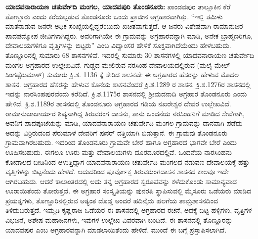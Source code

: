 \textbf{ಯಾದವನಾರಾಯಣ ಚತುರ್ವೇದಿ ಮಂಗಲ, ಯಾದವಪುರಿ \general{\enginline{-}} ತೊಂಡನೂರು:} ಪಾಂಡವಪುರ ತಾಲ್ಲೂಕಿನ ಕೆರೆ ತೊಣ್ಣೂರು ಎಂದು ಕರೆಯಲ್ಪಡುವ ತೊಂಡನೂರು ಒಂದು ಪ್ರಾಚೀನ ಅಗ್ರಹಾರವಾಗಿತ್ತು. “ಇಲ್ಲಿ ತಮಿಳು ಮಾತನಾಡುವ ಜನರೇ ಅಧಿಕ ಸಂಖ್ಯೆಯಲ್ಲಿದ್ದರೆಂಬುದು ಖಚಿತವಾಗುತ್ತದೆ. ಆ ಜನರು ವಿಶೇಷವಾಗಿ ರಾಮಾನುಜರ ಪಾದಪದ್ಮೋಪ ಜೀವಿಗಳಾಗಿದ್ದರು. ಅವರಿಗಾಗಿಯೇ ಈ ಗ್ರಾಮವನ್ನು ಅಗ್ರಹಾರವನ್ನಾಗಿ ಮಾಡಿ, ಅನೇಕ ಬ್ರಾಹ್ಮಣರಿಗೂ, ದೇವಾಲಯಗಳಿಗೂ ವೃತ್ತಿಗಳನ್ನು ಬಿಟ್ಟರು” ಎಂಬ ವಿದ್ವಾಂಸರ ಹೇಳಿಕೆ ಸೂಕ್ತವಾಗಿದೆಯೆಂದು ಹೇಳಬಹುದು. ತೊಣ್ಣೂರಿನಲ್ಲಿ ಸುಮಾರು 68 ಶಾಸನಗಳಿವೆ. ಇದರಲ್ಲಿ ಸುಮಾರು 30 ಶಾಸನಗಳಲ್ಲಿ ಯಾದವನಾರಾಯಣ ಚತುರ್ವೇದಿ ಮಂಗಲ ಅಗ್ರಹಾರದ ಉಲ್ಲೇಖವಿದೆ. ಗುಡ್ಡದ ಮೇಲಿರುವ ನರಸಿಂಹ ದೇವಾಲಯದಲ್ಲಿರುವ (ಮಲೈ ಮೇಲ್​ ಸಿಂಗಪ್ಪೆರುಮಾಳ್​) ಸುಮಾರು ಕ್ರಿ.ಶ. 1136 ಕ್ಕೆ ಸೇರಿದ ಶಾಸನವೇ ಈ ಅಗ್ರಹಾರದ ಹೆಸರನ್ನು ಹೇಳುವ ಮೊದಲ ಶಾಸನ. ಅಗ್ರಹಾರದ ಹೆಸರನ್ನು ಹೇಳುವ ಕೊನೆಯ ಶಾಸನವೆಂದರೆ ಕ್ರಿ.ಶ.1289 ರ ಶಾಸನ. ಕ್ರಿ.ಶ.1276ರ ಶಾಸನದಲ್ಲಿ ಇದನ್ನು ನಾರಸಿಂಹಪುರವೆಂದು ಕರೆದಿದೆ. ಕ್ರಿ.ಶ.1175ರ ಶಾಸನದಲ್ಲಿ ಶ‍್ರೀಮದನಾದಿ ಅಗ್ರಹಾರ ತೊಂಡನೂರು ಎಂದು ಹೇಳಿದೆ. ಕ್ರಿ.ಶ.1189ರ ಶಾಸನದಲ್ಲಿ ತೊಂಡನೂರು ಅಗ್ರಹಾರದ ಗಡಿಯ ನಖರೇಶ್ವರ ದೇವರ ಉಲ್ಲೇಖವಿದೆ. ರಾಮಾನುಜಾಚಾರ್ಯರ ಶಿಷ್ಯನಾಗಿದ್ದ ತಿರುವರಂಗ ದಾಸನು, ತಾನು ಒಂದನೆಯ ನರಸಿಂಹನಿಗೆ ಮಾಡಿದ ಸೇವೆಗಾಗಿ, ಅವನಿಗೆ ಪಾದಪೂಜೆಯನ್ನು ಮಾಡಿ, ಯಾದವನಾರಾಯಣ ಚತುರ್ವೇದಿ ಮಂಗಲ ಗ್ರಾಮವನ್ನು ದಾನವಾಗಿ ಪಡೆದು ಅದನ್ನು ವಿರ್ರಿರುದಂದ ಪೆರುಮಾಳೆ ದೇವರಿಗೆ ಪುನರ್​ ದತ್ತಿಯಾಗಿ ಬಿಡುತ್ತಾನೆ. ಈ ಗ್ರಾಮವು ತೊಂಡನೂರು ಗ್ರಾಮವಾಗಿರಬಹುದು. ಇದರಿಂದ ತೊಂಡನೂರು ಗ್ರಾಮವೇ ಬೇರೆ ಹಾಗೂ ಅಗ್ರಹಾರದ ಭಾಗವೇ ಬೇರೆ ಎಂದು ಊಹಿಸಬಹುದು. ಈಗಲೂ ಊರು ಮತ್ತು ದೇವಾಲಯಗಳು ದೂರದೂರದಲ್ಲಿವೆ. ಒಂದನೆಯ ನಾರಸಿಂಹನು ಕೋಡಾಲದ ಬೀಡಿನಿಂದ ಆಳುತ್ತಿದ್ದಾಗ ಯಾದವನಾರಾಯಣ ಚತುರ್ವೇದಿ ಮಂಗಲದ ನಡುವಣ ದೇವಾಲಯಕ್ಕೆ ಹತ್ತು ವೃತ್ತಿಗಳನ್ನು ಬಿಟ್ಟನೆಂದು ಹೇಳಿದೆ. ಆದುದರಿಂದ ಪೂರ್ವೋಕ್ತ ತಿರುವರುಂಗದಾಸನ ಶಾಸನದ ಕಾಲವೂ ಇದೇ ಆಗಿರಬಹುದು. ಆದರೆ ಕಾಲಾಂತರದಲ್ಲಿ ಅದು ತನ್ನ ಅಗ್ರಹಾರದ ಸ್ವರೂಪವನ್ನು ಕಳೆದುಕೊಂಡು ಸಾಮಾನ್ಯವಾದ ಊರಾಯಿತೆಂದು ತೋರುತ್ತದೆ. ಈ ಅಗ್ರಹಾರ ಸಂಸ್ಕೃತಿಯನ್ನು ಪುನರಪಿ ಸ್ಥಾಪಿಸುವಲ್ಲಿ ಮೈಸೂರು ಒಡೆಯರು ಮಾಡಿದ ಪ್ರಯತ್ನಗಳು, ತೊಣ್ಣೂರಿನಲ್ಲಿರುವ ಅತ್ಯಂತ ದೊಡ್ಡ ಅಂದರೆ ಹದಿನೈದು ಹಲಗೆಯ ತಾಮ್ರಶಾಸನದಿಂದ ತಿಳಿದುಬರುತ್ತದೆ. ಇಮ್ಮಡಿ ಕೃಷ್ಣರಾಜ ಒಡೆಯರ ಈ ಶಾಸನದಲ್ಲಿ ಅಗ್ರಹಾರದ ರಚನೆ, ಅದಕ್ಕೆ ಬಿಟ್ಟ ಹಳ್ಳಿಗಳು, ವೃತ್ತಿಗಳ ವಿಭಜನೆ, ಅಶೇಷ ಮಹಾಜನಗಳು, ಇವುಗಳ ಉಲ್ಲೇಖ ವಿವರವಾಗಿ ಬಂದಿದೆ. ಈ ಶಾಸನದಲ್ಲಿ ತೊಣ್ಣೂರನ್ನು ಯಾದವಪುರ ಎಂಬ ಅಗ್ರಹಾರವನ್ನಾಗಿ ಮಾಡಲಾಯಿತೆಂದು ಹೇಳಿದೆ. ಮುಂದೆ ಈ ಬಗ್ಗೆ ಪ್ರಸ್ತಾಪಿಸಲಾಗಿದೆ. 

